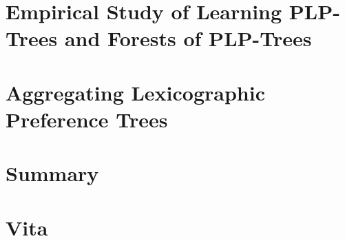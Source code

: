 \documentclass[final]{ukthesis}
\begin{document}
\chapter{Empirical Study of Learning PLP-Trees and Forests of PLP-Trees\label{ch:PLPTF}}

\copyrightnotice

\chapter{Aggregating Lexicographic Preference Trees\label{ch:aggLP}}

\copyrightnotice

%

\chapter{Summary\label{ch:summary}}

\copyrightnotice


\backmatter



\chapter{Vita}

\copyrightnotice
\end{document}
